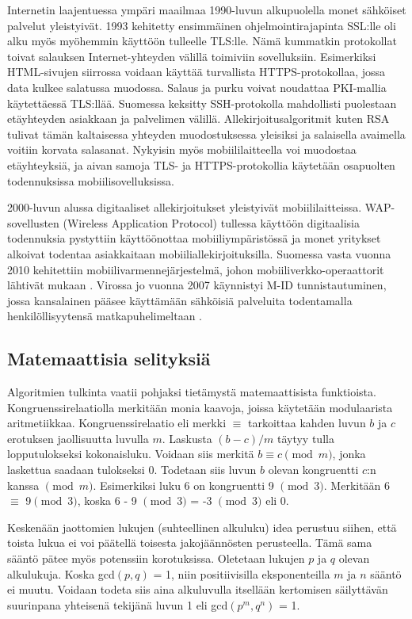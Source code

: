 \documentclass[finnish]{tktltiki2}
\theoremstyle{definition}
\theoremstyle{remark}
\begin{document}
Internetin laajentuessa ympäri maailmaa 1990-luvun alkupuolella monet sähköiset palvelut yleistyivät. 1993 kehitetty ensimmäinen ohjelmointirajapinta SSL:lle oli alku myös myöhemmin käyttöön tulleelle TLS:lle. Nämä kummatkin protokollat toivat salauksen Internet-yhteyden välillä toimiviin sovelluksiin. Esimerkiksi HTML-sivujen siirrossa voidaan käyttää turvallista HTTPS-protokollaa, jossa data kulkee salatussa muodossa. Salaus ja purku voivat noudattaa PKI-mallia käytettäessä TLS:llää. Suomessa keksitty SSH-protokolla mahdollisti puolestaan etäyhteyden asiakkaan ja palvelimen välillä. Allekirjoitusalgoritmit kuten RSA tulivat tämän kaltaisessa yhteyden muodostuksessa yleisiksi ja salaisella avaimella voitiin korvata salasanat. Nykyisin myös mobiililaitteella voi muodostaa etäyhteyksiä, ja aivan samoja TLS- ja HTTPS-protokollia käytetään osapuolten todennuksissa mobiilisovelluksissa.

2000-luvun alussa digitaaliset allekirjoitukset yleistyivät mobiililaitteissa. WAP-sovellusten (Wireless Application Protocol) tullessa käyttöön digitaalisia todennuksia pystyttiin käyttöönottaa mobiiliympäristössä ja monet yritykset alkoivat todentaa asiakkaitaan mobiiliallekirjoituksilla. Suomessa vasta vuonna 2010 kehitettiin mobiilivarmennejärjestelmä, johon mobiiliverkko-operaattorit lähtivät mukaan \cite{mobiva}. Virossa jo vuonna 2007 käynnistyi M-ID tunnistautuminen, jossa kansalainen pääsee käyttämään sähköisiä palveluita todentamalla henkilöllisyytensä matkapuhelimeltaan \cite{estonia}. 

\subsection{Matemaattisia selityksiä}

Algoritmien tulkinta vaatii pohjaksi tietämystä matemaattisista funktioista. Kongruenssirelaatiolla merkitään monia kaavoja, joissa käytetään modulaarista aritmetiikkaa. Kongruenssirelaatio eli merkki $\equiv$ tarkoittaa kahden luvun $b$ ja $c$ erotuksen jaollisuutta luvulla $m$. Laskusta $(b - c)/m$ täytyy tulla lopputulokseksi kokonaisluku. Voidaan siis merkitä $b \equiv c \pmod{m}$, jonka laskettua saadaan tulokseksi 0. Todetaan siis luvun $b$ olevan kongruentti $c$:n kanssa $\pmod{m}$. Esimerkiksi luku 6 on kongruentti 9 $\pmod{3}$. Merkitään 6 $\equiv $ 9$ \pmod{3}$, koska 6 - 9 $\pmod{3}$ = -3 $\pmod{3}$ eli 0. \cite{cong}

Keskenään jaottomien lukujen (suhteellinen alkuluku) idea perustuu siihen, että toista lukua ei voi päätellä toisesta jakojäännösten perusteella. Tämä sama sääntö pätee myös potenssiin korotuksissa. Oletetaan lukujen $p$ ja $q$ olevan alkulukuja. Koska gcd$(p, q)$ = 1, niin positiivisilla eksponenteilla $m$ ja $n$ sääntö ei muutu. Voidaan todeta siis aina alkuluvulla itsellään kertomisen säilyttävän suurinpana yhteisenä tekijänä luvun 1 eli gcd$(p^m, q^n)$ = 1. \cite{rel}  
\end{document}
